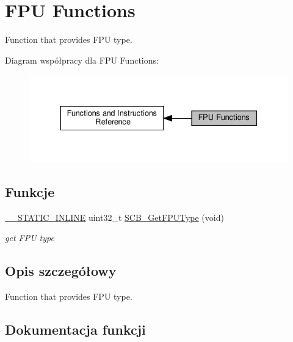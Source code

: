 \hypertarget{group___c_m_s_i_s___core___fpu_functions}{}\section{F\+PU Functions}
\label{group___c_m_s_i_s___core___fpu_functions}


Function that provides F\+PU type.  


Diagram współpracy dla F\+PU Functions\+:\nopagebreak
\begin{figure}[H]
\begin{center}
\leavevmode
\includegraphics[width=331pt]{group___c_m_s_i_s___core___fpu_functions}
\end{center}
\end{figure}
\subsection*{Funkcje}
\begin{DoxyCompactItemize}
\item 
\hyperlink{cmsis__iccarm_8h_aba87361bfad2ae52cfe2f40c1a1dbf9c}{\+\_\+\+\_\+\+S\+T\+A\+T\+I\+C\+\_\+\+I\+N\+L\+I\+NE} uint32\+\_\+t \hyperlink{group___c_m_s_i_s___core___fpu_functions_ga6bcad99ce80a0e7e4ddc6f2379081756}{S\+C\+B\+\_\+\+Get\+F\+P\+U\+Type} (void)
\begin{DoxyCompactList}\small\item\em get F\+PU type \end{DoxyCompactList}\end{DoxyCompactItemize}


\subsection{Opis szczegółowy}
Function that provides F\+PU type. 



\subsection{Dokumentacja funkcji}
\mbox{\label{group___c_m_s_i_s___core___fpu_functions_ga6bcad99ce80a0e7e4ddc6f2379081756}} 
